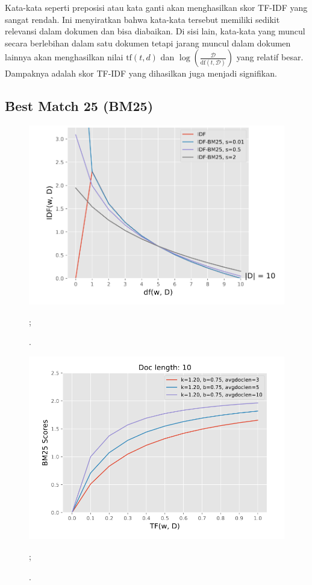     Kata-kata seperti preposisi atau kata ganti akan menghasilkan skor TF-IDF yang sangat rendah. Ini menyiratkan bahwa kata-kata tersebut memiliki sedikit relevansi dalam dokumen dan bisa diabaikan. Di sisi lain, kata-kata yang muncul secara berlebihan dalam satu dokumen tetapi jarang muncul dalam dokumen lainnya akan menghasilkan nilai $\text{tf}(t, d)$ dan $\log \left(\frac{\mathcal{D}}{\text{df}(t, \mathcal{D})}\right)$ yang relatif besar. Dampaknya adalah skor TF-IDF yang dihasilkan juga menjadi signifikan.

    \subsection{\f{Best Match 25} (BM25)}
    \label{sec:bm25}

    \begin{figure}
        \centering
        \includegraphics[width=1\textwidth]{assets/pics/smoothed-idf.png}
        \caption{\license.};
        \label{fig:smoothed-idf}
    \end{figure}

    \begin{figure}
        \centering
        \includegraphics[width=1\textwidth]{assets/pics/effect-bm25-long-doc.png}
        \caption{\license.};
        \label{fig:effect-bm25-long-doc}
    \end{figure}

